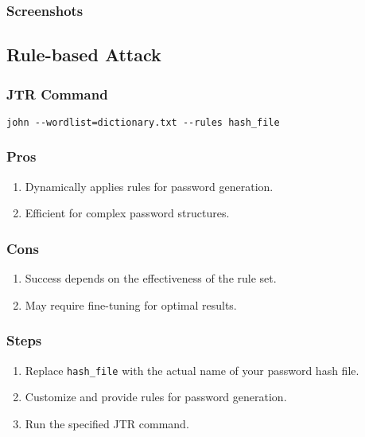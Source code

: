 \documentclass[11pt]{article}
\begin{document}
\subsubsection{Screenshots}


\subsection{Rule-based Attack}

\subsubsection{JTR Command}

\begin{verbatim}
john --wordlist=dictionary.txt --rules hash_file
\end{verbatim}

\subsubsection{Pros}

\begin{enumerate}
    \item Dynamically applies rules for password generation.
    \item Efficient for complex password structures.
\end{enumerate}

\subsubsection{Cons}

\begin{enumerate}
    \item Success depends on the effectiveness of the rule set.
    \item May require fine-tuning for optimal results.
\end{enumerate}

\subsubsection{Steps}

\begin{enumerate}
    \item Replace \texttt{hash\_file} with the actual name of your password hash file.
    \item Customize and provide rules for password generation.
    \item Run the specified JTR command.
\end{enumerate}
\end{document}
